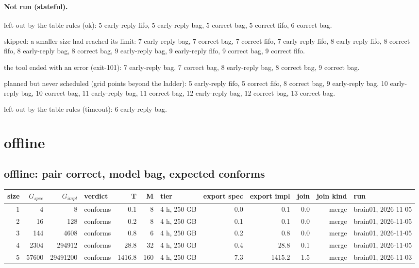 \documentclass[10pt]{article}
\begin{document}
\paragraph{Not run (stateful).}
left out by the table rules (ok): 5 early-reply fifo, 5 early-reply bag, 5 correct bag, 5 correct fifo, 6 correct bag.\par
skipped: a smaller size had reached its limit: 7 early-reply bag, 7 correct bag, 7 correct fifo, 7 early-reply fifo, 8 early-reply fifo, 8 correct fifo, 8 early-reply bag, 8 correct bag, 9 early-reply bag, 9 early-reply fifo, 9 correct bag, 9 correct fifo.\par
the tool ended with an error (exit-101): 7 early-reply bag, 7 correct bag, 8 early-reply bag, 8 correct bag, 9 correct bag.\par
planned but never scheduled (grid points beyond the ladder): 5 early-reply fifo, 5 correct fifo, 8 correct bag, 9 early-reply bag, 10 early-reply bag, 10 correct bag, 11 early-reply bag, 11 correct bag, 12 early-reply bag, 12 correct bag, 13 correct bag.\par
left out by the table rules (timeout): 6 early-reply bag.\par
\section*{offline}
\subsection*{offline: pair \textsf{correct}, model bag, expected conforms}
\begin{longtable}{@{}rrrlrrlrrrrl@{}}
\toprule
size & $G_{\mathit{spec}}$ & $G_{\mathit{impl}}$ & verdict & T & M & tier & export spec & export impl & join & join kind & run \\
\midrule
\endhead
\color{blue} 1 & 4 & 8 & conforms & 0.1 & 8 & 4 h, 250 GB & 0.0 & 0.1 & 0.0 & merge & brain01, 2026-11-05 \\
\color{blue} 2 & 16 & 128 & conforms & 0.2 & 8 & 4 h, 250 GB & 0.1 & 0.1 & 0.0 & merge & brain01, 2026-11-05 \\
\color{blue} 3 & 144 & 4608 & conforms & 0.8 & 6 & 4 h, 250 GB & 0.2 & 0.8 & 0.0 & merge & brain01, 2026-11-05 \\
\color{blue} 4 & 2304 & 294912 & conforms & 28.8 & 32 & 4 h, 250 GB & 0.4 & 28.8 & 0.1 & merge & brain01, 2026-11-05 \\
\color{blue} 5 & 57600 & 29491200 & conforms & 1416.8 & 160 & 4 h, 250 GB & 7.3 & 1415.2 & 1.5 & merge & brain01, 2026-11-03 \\
\bottomrule
\end{longtable}
\end{document}
